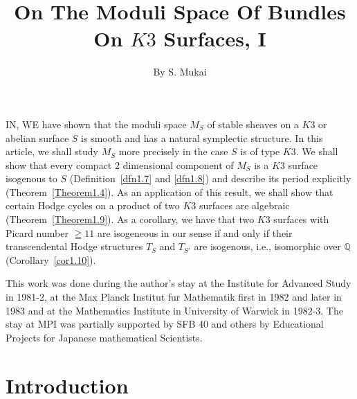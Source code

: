 \title{On The Moduli Space Of Bundles On $K3$ Surfaces, I}

\author{By S. Mukai}

\date{}
\maketitle

\setcounter{page}{263}
\setcounter{pageoriginal}{340}

IN\pageoriginale \cite{key12}, WE have shown that the moduli space $M_S$ of stable
sheaves on a $K3$ or abelian surface $S$ is smooth and has a natural
symplectic structure. In this article, we shall study $M_S$ more
precisely in the case $S$ is of type $K3$. We shall show that every
compact $2$ dimensional component of $M_S$ is a $K3$ surface isogenous
to $S$ (Definition~\ref{dfn1.7} and \ref{dfn1.8}) and describe its
period explicitly (Theorem~\ref{Theorem1.4}). As an application of
this result, we shall show that certain Hodge cycles on a product of
two $K3$ surfaces are algebraic (Theorem~\ref{Theorem1.9}). As a
corollary, we have that two $K3$ surfaces with Picard number $\geqq
11$ are isogeneous in our sense if and only if their transcendental
Hodge structures $T_S$ and $T_{S'}$ are isogenous, i.e., isomorphic
over $\mathbb{Q}$ (Corollary~\ref{cor1.10}).

This work was done during the author's stay at the Institute for
Advanced Study in 1981-2, at the Max Planck Institut fur Mathematik
first in 1982 and later in 1983 and at the Mathematics Institute in
University of Warwick in 1982-3. The stay at MPI was partially
supported by SFB 40 and others by Educational Projects for Japanese
mathematical Scientists. 

\section{Introduction}\label{s1}\pageoriginale

